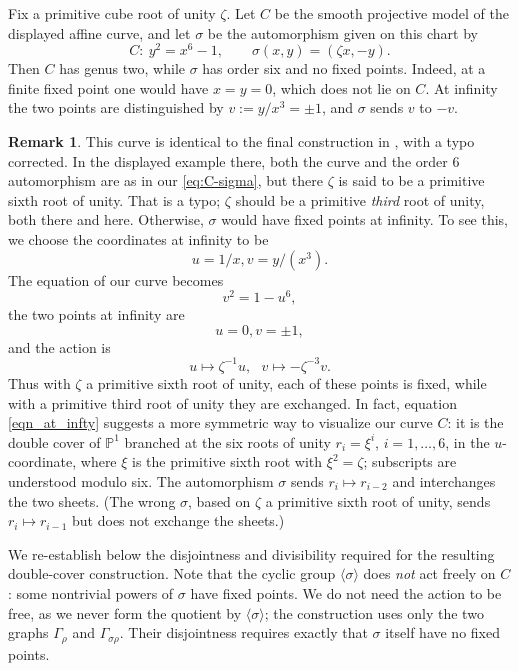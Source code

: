 \documentclass[11pt,a4paper,dvipsnames]{amsart}
\numberwithin{equation}{section}
\theoremstyle{plain}
\theoremstyle{definition}
\newtheorem{remark}[theorem]{Remark}
\newcommand{\PP}{\mathbb P}
\begin{document}
Fix a primitive cube root of unity $\zeta$.  Let $C$ be the smooth
projective model of the displayed affine curve, and let $\sigma$ be the
automorphism given on this chart by
\begin{equation}\label{eq:C-sigma}
 C:\ y^2=x^6-1,
 \qquad
 \sigma(x,y)=(\zeta x,-y).
\end{equation}
Then $C$ has genus two, while $\sigma$ has order six and no fixed points.
Indeed, at a finite fixed point one would have $x=y=0$, which does not lie
on $C$.  At infinity the two points are distinguished by
$v:=y/x^3=\pm1$, and $\sigma$ sends $v$ to $-v$.

\begin{remark}\label{rem:BD-correction}
This curve is identical to the final construction in
\cite{BryanDonagi}, with a typo corrected. In the displayed example there, 
both the curve and the order 6 automorphism are as in our \eqref{eq:C-sigma}, 
but there $\zeta$ is said to be a primitive sixth root of unity. That is a typo; 
$\zeta$ should be a primitive {\emph {third}} root of unity,
both there and here.
Otherwise, $\sigma$ would have fixed points at infinity.
To see this, we choose the coordinates at infinity to be
\[
u=1/x, v=y/(x^3).
\]
The equation of our curve becomes
\begin{equation} \label{eqn_at_infty}
v^2 = 1-u^6,
\end{equation}
the two points at infinity are
\[
u=0, v=\pm 1,
\]
and the action is
\[
u \mapsto \zeta^{-1} u, \ \ \
v \mapsto - \zeta^{-3} v.
\]
Thus with $\zeta$ a primitive sixth root of unity, each of these points is fixed, while with a primitive third root of unity they are exchanged. In fact, equation \eqref{eqn_at_infty} suggests a more symmetric way to visualize our curve $C$: it is the double cover of $\PP^1$ branched at the six roots of unity $r_i=\xi^i$, $i=1,\ldots,6$, in the $u$-coordinate, where
$\xi$ is the primitive sixth root with $\xi^2=\zeta$; subscripts are
understood modulo six. The automorphism $\sigma$ sends $r_i \mapsto r_{i-2}$ and interchanges the two sheets. (The wrong $\sigma$, based on $\zeta$ a primitive sixth root of unity, sends $r_i \mapsto r_{i-1}$ but does not exchange the sheets.) 


We re-establish below the disjointness and
divisibility required for the resulting double-cover construction.
Note that the cyclic group $\langle\sigma\rangle$ does \emph{not} act freely on
$C$: some nontrivial powers of $\sigma$ have fixed points.  
We do not need the action to be free, as we never form the quotient by
$\langle\sigma\rangle$; the construction uses only the two graphs
$\Gamma_\rho$ and $\Gamma_{\sigma\rho}$.  Their disjointness requires
exactly that $\sigma$ itself have no fixed points.
\end{remark}
\end{document}
